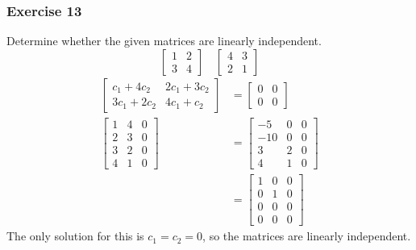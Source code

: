 \documentclass[letterpaper, 12pt]{math}
\begin{document}
\subsubsection*{Exercise 13}
Determine whether the given matrices are linearly independent.
\[ \begin{bmatrix}1 & 2 \\ 3 & 4\end{bmatrix} \quad
  \begin{bmatrix}4 & 3 \\ 2 & 1\end{bmatrix} \]
\begin{align*}
  \begin{bmatrix}
    c_1+4c_2 & 2c_1+3c_2 \\
    3c_1+2c_2 & 4c_1+c_2
  \end{bmatrix} &= \begin{bmatrix}
    0 & 0 \\
    0 & 0
  \end{bmatrix} \\
  \begin{bmatrix}
    1 & 4 & 0 \\
    2 & 3 & 0 \\
    3 & 2 & 0 \\
    4 & 1 & 0
  \end{bmatrix} &= \begin{bmatrix}
    -5 & 0 & 0 \\
    -10 & 0 & 0 \\
    3 & 2 & 0 \\
    4 & 1 & 0
  \end{bmatrix} \\
  &= \begin{bmatrix}
    1 & 0 & 0 \\
    0 & 1 & 0 \\
    0 & 0 & 0 \\
    0 & 0 & 0
  \end{bmatrix}
\end{align*}
The only solution for this is \( c_1 = c_2 = 0 \), so the matrices are linearly
independent.
\end{document}
